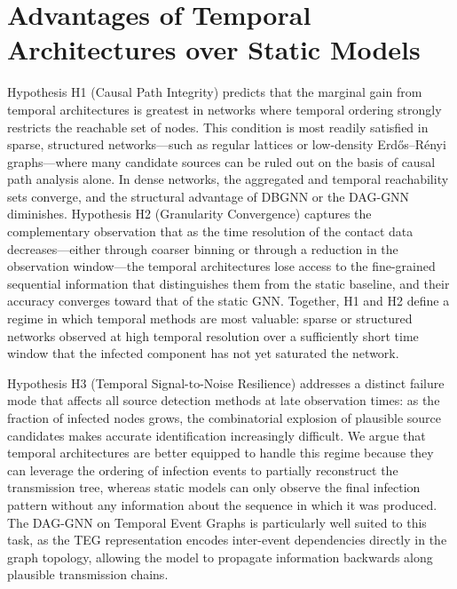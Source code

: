 \section{Advantages of Temporal Architectures over Static Models}
\label{st:temporalvsstatic}

Hypothesis H1 (Causal Path Integrity) predicts that the marginal gain from
temporal architectures is greatest in networks where temporal ordering strongly
restricts the reachable set of nodes. This condition is most readily satisfied
in sparse, structured networks---such as regular lattices or low-density
Erd\H{o}s--R\'enyi graphs---where many candidate sources can be ruled out on
the basis of causal path analysis alone. In dense networks, the aggregated and
temporal reachability sets converge, and the structural advantage of DBGNN or
the DAG-GNN diminishes. Hypothesis H2 (Granularity Convergence) captures the
complementary observation that as the time resolution of the contact data
decreases---either through coarser binning or through a reduction in the
observation window---the temporal architectures lose access to the fine-grained
sequential information that distinguishes them from the static baseline, and
their accuracy converges toward that of the static GNN. Together, H1 and H2
define a regime in which temporal methods are most valuable: sparse or
structured networks observed at high temporal resolution over a sufficiently
short time window that the infected component has not yet saturated the network.

Hypothesis H3 (Temporal Signal-to-Noise Resilience) addresses a distinct
failure mode that affects all source detection methods at late observation
times: as the fraction of infected nodes grows, the combinatorial explosion of
plausible source candidates makes accurate identification increasingly
difficult. We argue that temporal architectures are better equipped to handle
this regime because they can leverage the ordering of infection events to
partially reconstruct the transmission tree, whereas static models can only
observe the final infection pattern without any information about the sequence
in which it was produced. The DAG-GNN on Temporal Event Graphs is particularly
well suited to this task, as the TEG representation \cite{Saramaki2019} encodes
inter-event dependencies directly in the graph topology, allowing the model to
propagate information backwards along plausible transmission chains.

